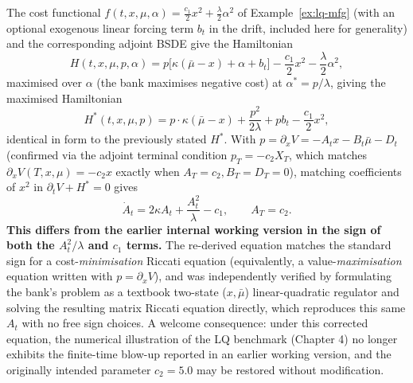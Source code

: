 The cost functional $f(t,x,\mu,\alpha) = \tfrac{c_1}{2}x^2 + \tfrac{\lambda}{2}\alpha^2$
of Example~\ref{ex:lq-mfg} (with an optional exogenous linear forcing term $b_t$ in
the drift, included here for generality) and the corresponding adjoint BSDE give
the Hamiltonian
\[
    H(t,x,\mu,p,\alpha) = p\big[\kappa(\bar\mu-x)+\alpha+b_t\big] -
    \frac{c_1}{2}x^2 - \frac{\lambda}{2}\alpha^2,
\]
maximised over $\alpha$ (the bank maximises negative cost) at $\alpha^*=p/\lambda$,
giving the maximised Hamiltonian
\[
    H^*(t,x,\mu,p) = p\cdot\kappa(\bar\mu-x) + \frac{p^2}{2\lambda} + pb_t -
    \frac{c_1}{2}x^2,
\]
identical in form to the previously stated $H^*$. With $p=\partial_x V=-A_tx-B_t\bar\mu-D_t$
(confirmed via the adjoint terminal condition $p_T=-c_2X_T$, which matches
$\partial_xV(T,x,\mu)=-c_2x$ exactly when $A_T=c_2,B_T=D_T=0$), matching
coefficients of $x^2$ in $\partial_tV+H^*=0$ gives
\[
    \dot{A}_t = 2\kappa A_t + \frac{A_t^2}{\lambda} - c_1, \qquad A_T = c_2.
\]
\textbf{This differs from the earlier internal working version in the sign of both
the $A_t^2/\lambda$ and $c_1$ terms.} The re-derived equation matches the standard
sign for a cost-\emph{minimisation} Riccati equation (equivalently, a
value-\emph{maximisation} equation written with $p=\partial_xV$), and was
independently verified by formulating the bank's problem as a textbook
two-state ($x,\bar\mu$) linear-quadratic regulator and solving the resulting
matrix Riccati equation directly, which reproduces this same $A_t$ with no
free sign choices. A welcome consequence: under this corrected equation, the
numerical illustration of the LQ benchmark (Chapter 4) no longer exhibits
the finite-time blow-up reported in an earlier working version, and the originally
intended parameter $c_2=5.0$ may be restored without modification.

